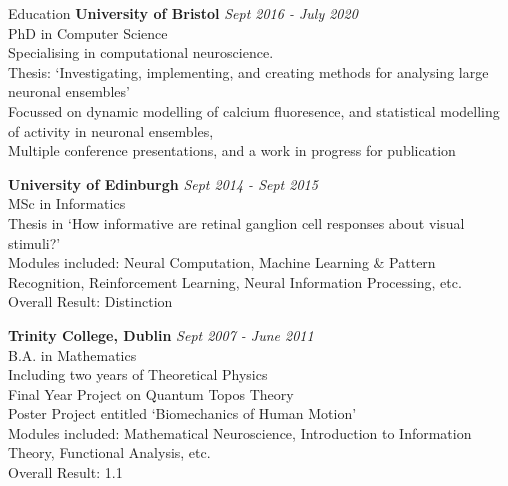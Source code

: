 \documentclass{resume} %
\begin{document}

\begin{rSection}{Education}
{\bf University of Bristol} \hfill {\em Sept 2016 - July 2020} \\
PhD in Computer Science \\
Specialising in computational neuroscience. \\
Thesis: `Investigating, implementing, and creating methods for analysing large neuronal ensembles' \\
Focussed on dynamic modelling of calcium fluoresence, and statistical modelling of activity in neuronal ensembles, \\
Multiple conference presentations, and a work in progress for publication

{\bf University of Edinburgh} \hfill {\em Sept 2014 - Sept 2015} \\
MSc in Informatics \\
Thesis in `How informative are retinal ganglion cell responses about visual stimuli?' \\
Modules included: Neural Computation, Machine Learning \& Pattern Recognition, Reinforcement Learning, Neural Information Processing, etc.  \smallskip \\
Overall Result: Distinction

{\bf Trinity College, Dublin} \hfill {\em Sept 2007 - June 2011} \\
B.A. in Mathematics \\
Including two years of Theoretical Physics \\
Final Year Project on Quantum Topos Theory \\
Poster Project entitled `Biomechanics of Human Motion' \\
Modules included: Mathematical Neuroscience, Introduction to Information Theory, Functional Analysis, etc. \smallskip \\
Overall Result: 1.1

\end{rSection}

\end{document}
